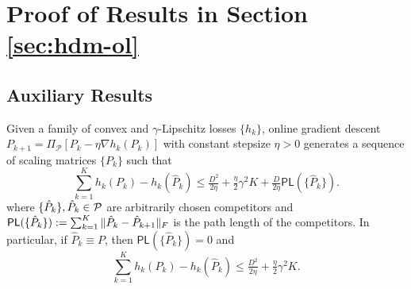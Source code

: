 \section{Proof of Results in Section \ref{sec:hdm-ol}} \label{app:proof-hdm-ol}

\subsection{Auxiliary Results}

\begin{lem} \label{lem:auxi-dynamic}
  Given a family of convex and $\gamma$-Lipschitz losses $\{ h_k \}$, online
  gradient descent $P_{k + 1} = \Pi_{\mathcal{P}} [P_k - \eta \nabla h_k
  (P_k)]$ with constant stepsize $\eta > 0$ generates a sequence of scaling
  matrices $\{ P_k \}$ such that
\begin{equation} \label{eqn:auxi-ogd-dynamic-regret}
	\textstyle \sum_{k = 1}^K h_k (P_k) - h_k (\hat{P}_k) \leq \tfrac{D^2}{2 \eta} +
     \tfrac{\eta}{2} \gamma^2 K + \tfrac{D}{2 \eta} \mathsf{PL} (\{ \hat{P}_k
     \}).
\end{equation}
  where $\{ \hat{P}_k \}, \hat{P}_k\in \mathcal{P}$ are arbitrarily chosen competitors and $\mathsf{PL}
  (\{ \hat{P}_k \}) := \sum_{k = 1}^K \| \hat{P}_k - \hat{P}_{k + 1}
  \|_F$ is the path length of the competitors. In particular, if $\hat{P}_k \equiv P$, then $\mathsf{PL} (\{ \hat{P}_k
     \})=0$ and 
\begin{equation} \label{eqn:auxi-ogd-static-regret}
	\textstyle \sum_{k = 1}^K h_k (P_k) - h_k (\hat{P}_k) \leq \tfrac{D^2}{2 \eta} +
     \tfrac{\eta}{2} \gamma^2 K.
\end{equation}
\end{lem}
